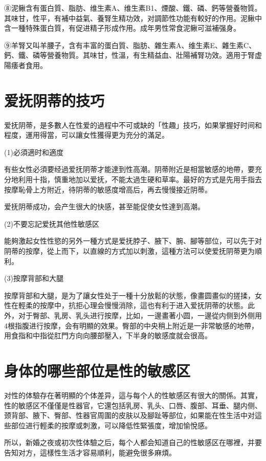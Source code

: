 \documentclass[12pt,UTF8]{ctexbook}
\begin{document}
⑧泥鳅含有蛋白質、脂肪、维生素A、维生素B1、煙酸、鐵、磷、鈣等營養物質。其味甘，性平，有補中益氣、養腎生精功效，对調節性功能有較好的作用。泥鳅中含一種特殊蛋白質，有促进精子形成作用。成年男性常食泥鳅可滋補强身。

⑨羊腎又叫羊腰子，含有丰富的蛋白質、脂肪、雜生素A、维生素E、雜生素C、鈣、鐵、磷等營養物質。其味甘，性溫，有生精益血、壯陽補腎功效。適用于腎虚陽痿者食用。

\section{爱抚阴蒂的技巧}

爱抚阴蒂，是多數人在性爱的過程中不可或缺的「性趣」技巧，如果掌握好时间和程度，運用得當，可以讓女性獲得更为充分的滿足。

(1)必須適时和適度

有些女性必須要经過爱抚阴蒂才能達到性高潮。阴蒂附近是相當敏感的地帶，要充分地利用十指，慎重地加以爱抚，不能太過生硬和草率。最好的方式是先用手指去按摩恥骨上方附近，待阴蒂的敏感度增高后，再去慢慢接近阴蒂。

爱抚阴蒂成功，会产生很大的快感，甚至能促使女性達到高潮。

(2)不要忘記爱抚其他性敏感区

能夠激起女性性慾的另外一種方式是爱抚脖子、腋下、腕、腳等部位，可以先于对阴蒂的按摩，從上而下，以直線的方式加以刺激，這種方法可以使爱抚阴蒂更为順利。

(3)按摩背部和大腿

按摩背部和大腿，是为了讓女性处于一種十分放鬆的状態，像畫圆畫似的搓揉，女性在輕柔的按摩中，抗拒心理会慢慢消除，這也有利于进入爱抚阴蒂的状態。此外，对于臀部、乳房、乳头进行按摩，比如，一邊畫著小圆，一邊從内侧到外侧用4根指腹进行按摩，会有明顯的效果。臀部的中央稍上附近是一非常敏感的地帶，用食指和中指從肛門方向向腰部壓入，下半身的敏感度就会很高。

\section{身体的哪些部位是性的敏感区}

对性的体驗存在著明顯的个体差异，這与每个人的性敏感区有很大的關係。其實，性的敏感区不僅僅是性器官，它還包括乳房、乳头、口唇、腹部、耳垂、腿内侧、颈背部、腋下、臀部、性器官周圍的皮肤以及腳趾等部位，如果能在性生活中对這些部位进行輕柔的按摩或刺激，可以降低性緊張度，增加愉悅感。

所以，新婚之夜或初次性体驗之后，每个人都会知道自己的性敏感区在哪裡，并要告知对方，這樣性生活才容易順利，能避免很多麻煩。
\end{document}
